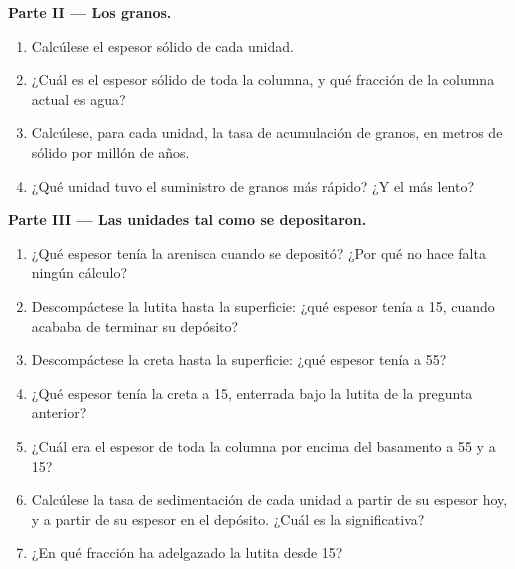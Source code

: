 \begin{problem}
\noindent\textbf{Parte II --- Los granos.}
\begin{enumerate}[resume]
  \item Calcúlese el espesor sólido de cada unidad.
  \item ¿Cuál es el espesor sólido de toda la columna, y qué fracción de la columna actual es agua?
  \item Calcúlese, para cada unidad, la tasa de acumulación de granos, en metros de sólido por millón de años.
  \item ¿Qué unidad tuvo el suministro de granos más rápido? ¿Y el más lento?
\end{enumerate}

\noindent\textbf{Parte III --- Las unidades tal como se depositaron.}
\begin{enumerate}[resume]
  \item ¿Qué espesor tenía la arenisca cuando se depositó? ¿Por qué no hace falta ningún cálculo?
  \item Descompáctese la lutita hasta la superficie: ¿qué espesor tenía a \qty{15}{\Ma}, cuando acababa de terminar su depósito?
  \item Descompáctese la creta hasta la superficie: ¿qué espesor tenía a \qty{55}{\Ma}?
  \item ¿Qué espesor tenía la creta a \qty{15}{\Ma}, enterrada bajo la lutita de la pregunta anterior?
  \item ¿Cuál era el espesor de toda la columna por encima del basamento a \qty{55}{\Ma} y a \qty{15}{\Ma}?
  \item Calcúlese la tasa de sedimentación de cada unidad a partir de su espesor hoy, y a partir de su espesor en el depósito. ¿Cuál es la significativa?
  \item ¿En qué fracción ha adelgazado la lutita desde \qty{15}{\Ma}?
\end{enumerate}


\end{problem}
